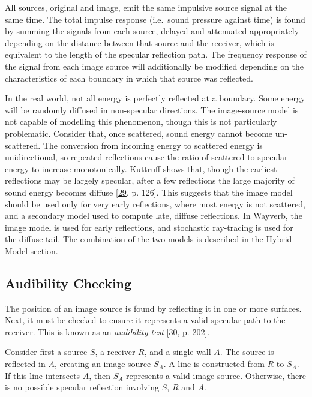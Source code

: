 \documentclass[]{scrreprt}
\begin{document}
All sources, original and image, emit the same impulsive source signal
at the same time. The total impulse response (i.e.~sound pressure
against time) is found by summing the signals from each source, delayed
and attenuated appropriately depending on the distance between that
source and the receiver, which is equivalent to the length of the
specular reflection path. The frequency response of the signal from each
image source will additionally be modified depending on the
characteristics of each boundary in which that source was reflected.

In the real world, not all energy is perfectly reflected at a boundary.
Some energy will be randomly diffused in non-specular directions. The
image-source model is not capable of modelling this phenomenon, though
this is not particularly problematic. Consider that, once scattered,
sound energy cannot become un-scattered. The conversion from incoming
energy to scattered energy is unidirectional, so repeated reflections
cause the ratio of scattered to specular energy to increase
monotonically. Kuttruff shows that, though the earliest reflections may
be largely specular, after a few reflections the large majority of sound
energy becomes diffuse
{[}\protect\hyperlink{ref-kuttruffux5froomux5f2009}{29}, p. 126{]}. This
suggests that the image model should be used only for very early
reflections, where most energy is not scattered, and a secondary model
used to compute late, diffuse reflections. In Wayverb, the image model
is used for early reflections, and stochastic ray-tracing is used for
the diffuse tail. The combination of the two models is described in the
\href{\%7B\%7B\%20site.baseurl\%20\%7D\%7D\%7B\%\%20link\%20hybrid.md\%20\%\%7D}{Hybrid
Model} section.

\subsection{Audibility Checking}\label{audibility-checking}

The position of an image source is found by reflecting it in one or more
surfaces. Next, it must be checked to ensure it represents a valid
specular path to the receiver. This is known as an \emph{audibility
test} {[}\protect\hyperlink{ref-vorlanderux5fauralization:ux5f2007}{30},
p. 202{]}.

Consider first a source \(S\), a receiver \(R\), and a single wall
\(A\). The source is reflected in \(A\), creating an image-source
\(S_A\). A line is constructed from \(R\) to \(S_A\). If this line
intersects \(A\), then \(S_A\) represents a valid image source.
Otherwise, there is no possible specular reflection involving \(S\),
\(R\) and \(A\).
\end{document}
